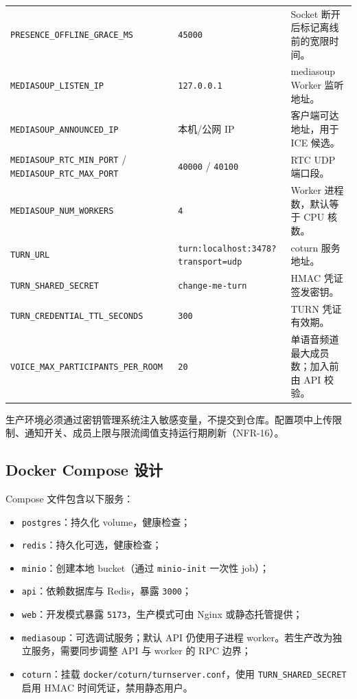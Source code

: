 \begin{tabularx}{\textwidth}{L{4.4cm}L{3.4cm}Y}
  \texttt{PRESENCE\_OFFLINE\_GRACE\_MS} & \texttt{45000} & Socket 断开后标记离线前的宽限时间。 \\
  \texttt{MEDIASOUP\_LISTEN\_IP} & \texttt{127.0.0.1} & mediasoup Worker 监听地址。 \\
  \texttt{MEDIASOUP\_ANNOUNCED\_IP} & 本机/公网 IP & 客户端可达地址，用于 ICE 候选。 \\
  \texttt{MEDIASOUP\_RTC\_MIN\_PORT} / \texttt{MEDIASOUP\_RTC\_MAX\_PORT} & \texttt{40000} / \texttt{40100} & RTC UDP 端口段。 \\
  \texttt{MEDIASOUP\_NUM\_WORKERS} & \texttt{4} & Worker 进程数，默认等于 CPU 核数。 \\
  \texttt{TURN\_URL} & \texttt{turn:localhost:3478?transport=udp} & coturn 服务地址。 \\
  \texttt{TURN\_SHARED\_SECRET} & \texttt{change-me-turn} & HMAC 凭证签发密钥。 \\
  \texttt{TURN\_CREDENTIAL\_TTL\_SECONDS} & \texttt{300} & TURN 凭证有效期。 \\
  \texttt{VOICE\_MAX\_PARTICIPANTS\_PER\_ROOM} & \texttt{20} & 单语音频道最大成员数；加入前由 API 校验。 \\
  \bottomrule
\end{tabularx}

生产环境必须通过密钥管理系统注入敏感变量，不提交到仓库。配置项中上传限制、通知开关、成员上限与限流阈值支持运行期刷新（NFR-16）。

\subsection{Docker Compose 设计}

Compose 文件包含以下服务：

\begin{itemize}
  \item \texttt{postgres}：持久化 volume，健康检查；
  \item \texttt{redis}：持久化可选，健康检查；
  \item \texttt{minio}：创建本地 bucket（通过 \texttt{minio-init} 一次性 job）；
  \item \texttt{api}：依赖数据库与 Redis，暴露 \texttt{3000}；
  \item \texttt{web}：开发模式暴露 \texttt{5173}，生产模式可由 Nginx 或静态托管提供；
  \item \texttt{mediasoup}：可选调试服务；默认 API 仍使用子进程 worker。若生产改为独立服务，需要同步调整 API 与 worker 的 RPC 边界；
  \item \texttt{coturn}：挂载 \texttt{docker/coturn/turnserver.conf}，使用 \texttt{TURN\_SHARED\_SECRET} 启用 HMAC 时间凭证，禁用静态用户。
\end{itemize}

